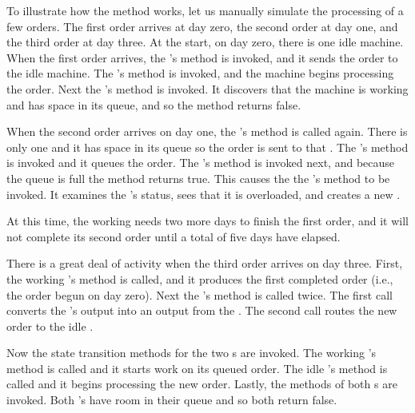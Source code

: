 To illustrate how the  method works, let us manually simulate the processing of a few orders. The first order arrives at day zero, the second order at day one, and the third order at day three. At the start, on day zero, there is one idle machine. When the first order arrives, the 's  method is invoked, and it sends the order to the idle machine. The 's  method is invoked, and the machine begins processing the order. Next the 's  method is invoked. It discovers that the machine is working and has space in its queue, and so the  method returns false.

When the second order arrives on day one, the 's  method is called again. There is only one  and it has space in its queue so the order is sent to that . The 's  method is invoked and it queues the order. The 's  method is invoked next, and because the queue is full the method returns true. This causes the the 's  method to be invoked. It examines the 's status, sees that it is overloaded, and creates a new .

At this time, the working  needs two more days to finish the first order, and it will not complete its second order until a total of five days have elapsed.

There is a great deal of activity when the third order arrives on day three. First, the working 's  method is called, and it produces the first completed order (i.e., the order begun on day zero). Next the 's  method is called twice. The first call converts the 's output into an output from the . The second call routes the new order to the idle .

Now the state transition methods for the two s are invoked. The working 's  method is called and it starts work on its queued order. The idle 's  method is called and it begins processing the new order. Lastly, the  methods of both s are invoked. Both 's have room in their queue and so both return false.

